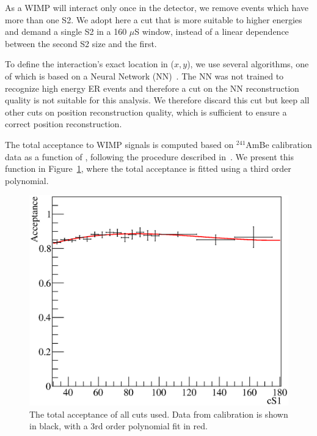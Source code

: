 As a WIMP will interact only once in the detector, we remove events which have more than one S2. We adopt here a cut that is more suitable to higher energies and demand a single S2 in a 160 $\mu$S window, instead of a linear dependence between the second S2 size and the first. 

To define the interaction's exact location in ($x,y$), we use several algorithms, one of which is based on a Neural Network (NN)~\cite{Aprile:2012vw}. The NN was not trained to recognize high energy ER events and therefore a cut on the NN reconstruction quality is not suitable for this analysis. We therefore discard this cut but keep all other cuts on position reconstruction quality, which is sufficient to ensure a correct position reconstruction. 

The total acceptance to WIMP signals is computed based on $^{241}$AmBe calibration data as a function of \cSi, following the procedure described in~\cite{Aprile:2012vw}. We present this function in Figure~\ref{fig:Acc}, where the total acceptance is fitted using a third order polynomial.

\begin{figure}[t!]
\begin{minipage}{0.9\linewidth}
\centerline{\includegraphics[width=1.\linewidth]{Figures/Acceptance.eps}}
\end{minipage}
\caption{The total acceptance of all cuts used. Data from calibration is shown in black, with a 3rd order polynomial fit in red.}
\label{fig:Acc}
\end{figure}

